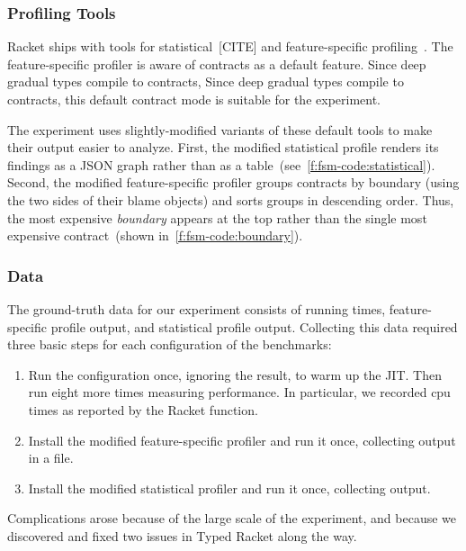 \subsubsection{Profiling Tools}

Racket ships with tools for statistical~[CITE] and feature-specific
profiling~\cite{}.
The feature-specific profiler is aware of contracts as a default feature.
Since deep gradual types compile to contracts,
Since deep gradual types compile to contracts, this default contract
mode is suitable for the experiment.

The experiment uses slightly-modified variants of these default tools
to make their output easier to analyze.
First, the modified statistical profile renders its
findings as a JSON graph rather than as a table~(see~\cref{f:fsm-code:statistical}).
Second, the modified feature-specific profiler groups contracts
by boundary (using the two sides of their blame objects) and sorts groups
in descending order.
Thus, the most expensive \emph{boundary} appears at the top rather than the single
most expensive contract~(shown in~\cref{f:fsm-code:boundary}).


\subsubsection{Data}
\label{sec:data}

The ground-truth data for our experiment consists of running times,
feature-specific profile output, and statistical profile output.
Collecting this data required three basic steps for each configuration
of the \numgtp{} benchmarks:
\begin{enumerate}
  \item
    Run the configuration once, ignoring the result, to warm up the JIT.
    Then run eight more times measuring performance.
    In particular, we recorded {cpu time}s as reported by the Racket
     function.
  \item
    Install the modified feature-specific profiler and run it once,
    collecting output in a file.
  \item
    Install the modified statistical profiler and run it once, collecting output.
\end{enumerate}
Complications arose because of the large scale of the experiment, and because
we discovered and fixed two issues in Typed Racket along the way.


